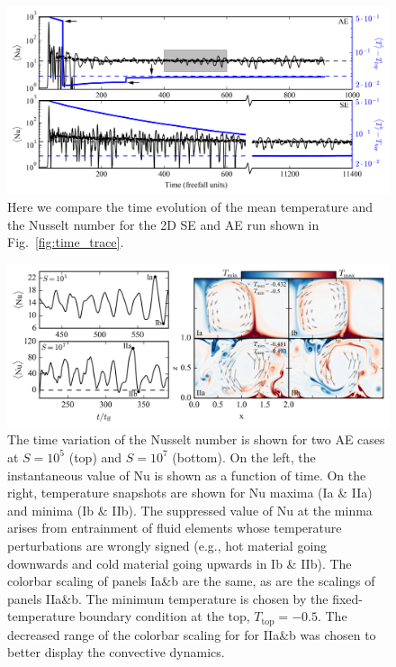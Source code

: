 \documentclass[aps, pre, onecolumn, nofootinbib, notitlepage, groupedaddress, amsfonts, amssymb, amsmath, longbibliography]{revtex4-1}
\begin{document}
\begin{figure}[b]
\includegraphics[width=\textwidth]{./figs/nu_v_time.png}
\caption{Here we compare the time evolution of the mean temperature and the
Nusselt number for the 2D SE and AE run shown in Fig.~\ref{fig:time_trace}.
\label{fig:nu_v_time} }
\end{figure}


\begin{figure}[t]
\includegraphics[width=\textwidth]{./figs/oscillating_plumes.png}
\caption{The time variation of the Nusselt number is shown for two AE cases at
$S = 10^5$ (top) and $S = 10^7$ (bottom). On the left, the instantaneous value of Nu
is shown as a function of time. On the right, temperature snapshots are shown for
Nu maxima (Ia \& IIa) and minima (Ib \& IIb). The suppressed value of Nu at the
minma arises from entrainment of fluid elements whose temperature perturbations
are wrongly signed (e.g., hot material going downwards and cold material going
upwards in Ib \& IIb). The colorbar scaling of panels Ia\&b are the same, as
are the scalings of panels IIa\&b. 
The minimum temperature is chosen by the fixed-temperature
boundary condition at the top, $T_{\text{top}} = -0.5$. The decreased range of
the colorbar scaling for
for IIa\&b was chosen to better display the convective dynamics.
\label{fig:oscillating_plumes} }
\end{figure}
\end{document}
